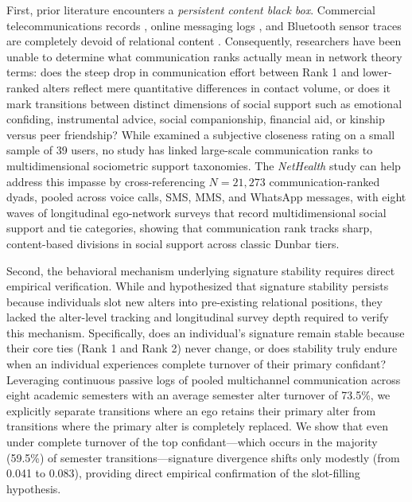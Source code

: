 \documentclass[11pt,letterpaper]{article}
\begin{document}
First, prior literature encounters a \textit{persistent content black box}. Commercial telecommunications records \citep{saramaeki2014persistence,heydari2018multichannel,iniguez2023universal}, online messaging logs \citep{li2018social,koltsova2021social}, and Bluetooth sensor traces \citep{li2022evidence} are completely devoid of relational content \citep{burt1985relation}. Consequently, researchers have been unable to determine what communication ranks actually mean in network theory terms: does the steep drop in communication effort between Rank 1 and lower-ranked alters reflect mere quantitative differences in contact volume, or does it mark transitions between distinct dimensions of social support \citep{wellman1990different-b11} such as emotional confiding, instrumental advice, social companionship, financial aid, or kinship versus peer friendship? While \citet{koltsova2021social} examined a subjective closeness rating on a small sample of 39 users, no study has linked large-scale communication ranks to multidimensional sociometric support taxonomies. The \textit{NetHealth} study can help address this impasse by cross-referencing $N = 21,273$ communication-ranked dyads, pooled across voice calls, SMS, MMS, and WhatsApp messages, with eight waves of longitudinal ego-network surveys that record multidimensional social support and tie categories, showing that communication rank tracks sharp, content-based divisions in social support across classic Dunbar tiers.

Second, the behavioral mechanism underlying signature stability requires direct empirical verification. While \citet{saramaeki2014persistence} and \citet{heydari2024dynamic} hypothesized that signature stability persists because individuals slot new alters into pre-existing relational positions, they lacked the alter-level tracking and longitudinal survey depth required to verify this mechanism. Specifically, does an individual's signature remain stable because their core ties (Rank 1 and Rank 2) never change, or does stability truly endure when an individual experiences complete turnover of their primary confidant? Leveraging continuous passive logs of pooled multichannel communication across eight academic semesters with an average semester alter turnover of 73.5\%, we explicitly separate transitions where an ego retains their primary alter from transitions where the primary alter is completely replaced. We show that even under complete turnover of the top confidant---which occurs in the majority (59.5\%) of semester transitions---signature divergence shifts only modestly (from 0.041 to 0.083), providing direct empirical confirmation of the slot-filling hypothesis.
\end{document}
